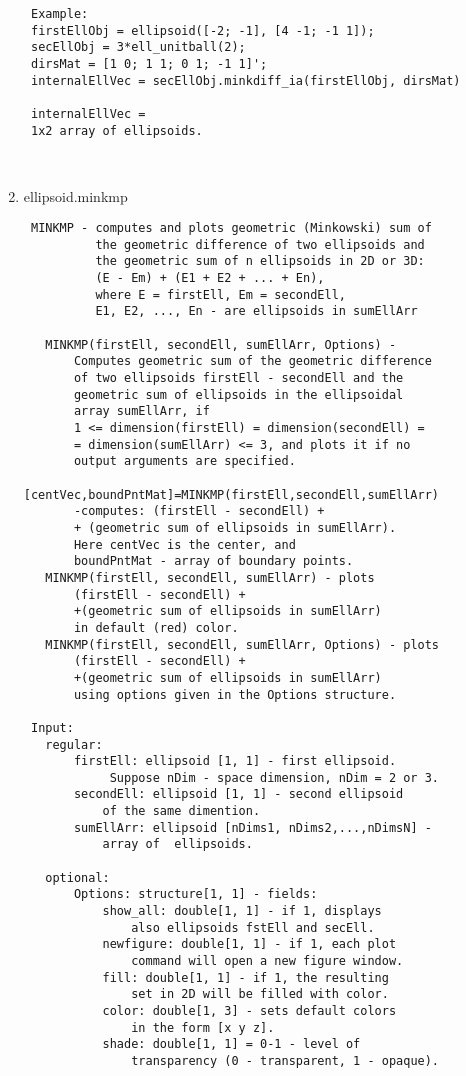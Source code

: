 \begin{enumerate}
\begin{lstlisting}
 Example:
 firstEllObj = ellipsoid([-2; -1], [4 -1; -1 1]);
 secEllObj = 3*ell_unitball(2);
 dirsMat = [1 0; 1 1; 0 1; -1 1]';
 internalEllVec = secEllObj.minkdiff_ia(firstEllObj, dirsMat)

 internalEllVec =
 1x2 array of ellipsoids.



\end{lstlisting}
\fontfamily{\familydefault}
\selectfont
\item {ellipsoid.minkmp}
\selectfont
\begin{lstlisting}
 MINKMP - computes and plots geometric (Minkowski) sum of
          the geometric difference of two ellipsoids and
          the geometric sum of n ellipsoids in 2D or 3D:
          (E - Em) + (E1 + E2 + ... + En),
          where E = firstEll, Em = secondEll,
          E1, E2, ..., En - are ellipsoids in sumEllArr

   MINKMP(firstEll, secondEll, sumEllArr, Options) -
       Computes geometric sum of the geometric difference
       of two ellipsoids firstEll - secondEll and the
       geometric sum of ellipsoids in the ellipsoidal
       array sumEllArr, if
       1 <= dimension(firstEll) = dimension(secondEll) =
       = dimension(sumEllArr) <= 3, and plots it if no
       output arguments are specified.

[centVec,boundPntMat]=MINKMP(firstEll,secondEll,sumEllArr)
       -computes: (firstEll - secondEll) +
       + (geometric sum of ellipsoids in sumEllArr).
       Here centVec is the center, and
       boundPntMat - array of boundary points.
   MINKMP(firstEll, secondEll, sumEllArr) - plots
       (firstEll - secondEll) +
       +(geometric sum of ellipsoids in sumEllArr)
       in default (red) color.
   MINKMP(firstEll, secondEll, sumEllArr, Options) - plots
       (firstEll - secondEll) +
       +(geometric sum of ellipsoids in sumEllArr)
       using options given in the Options structure.

 Input:
   regular:
       firstEll: ellipsoid [1, 1] - first ellipsoid.
            Suppose nDim - space dimension, nDim = 2 or 3.
       secondEll: ellipsoid [1, 1] - second ellipsoid
           of the same dimention.
       sumEllArr: ellipsoid [nDims1, nDims2,...,nDimsN] -
           array of  ellipsoids.

   optional:
       Options: structure[1, 1] - fields:
           show_all: double[1, 1] - if 1, displays
               also ellipsoids fstEll and secEll.
           newfigure: double[1, 1] - if 1, each plot
               command will open a new figure window.
           fill: double[1, 1] - if 1, the resulting
               set in 2D will be filled with color.
           color: double[1, 3] - sets default colors
               in the form [x y z].
           shade: double[1, 1] = 0-1 - level of
               transparency (0 - transparent, 1 - opaque).


\end{lstlisting}
\end{enumerate}

